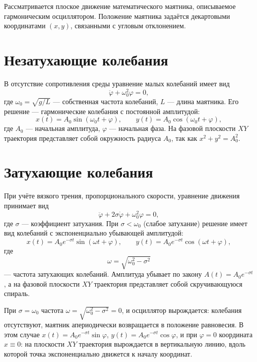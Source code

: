 \documentclass[a4paper]{article}
\newcommand{\subsectiontext}[1]{%
    \phantomsection
    \section*{\fontsize{13pt}{16pt}\selectfont\textbf{#1}}%
}
\begin{document}
Рассматривается плоское движение математического маятника, описываемое гармоническим осциллятором. Положение маятника задаётся декартовыми координатами $(x, y)$, связанными с угловым отклонением.

\subsectiontext{Незатухающие колебания}

В отсутствие сопротивления среды уравнение малых колебаний имеет вид
\begin{equation}
    \ddot{\varphi} + \omega_0^2 \varphi = 0,
\end{equation}
где $\omega_0 = \sqrt{g/L}$ --- собственная частота колебаний, $L$ --- длина маятника. Его решение --- гармонические колебания с постоянной амплитудой:
\begin{equation}
    x(t) = A_0 \sin(\omega_0 t + \varphi), \qquad
    y(t) = A_0 \cos(\omega_0 t + \varphi),
\end{equation}
где $A_0$ --- начальная амплитуда, $\varphi$ --- начальная фаза. На фазовой плоскости $XY$ траектория представляет собой окружность радиуса $A_0$, так как $x^2 + y^2 = A_0^2$.

\subsectiontext{Затухающие колебания}

При учёте вязкого трения, пропорционального скорости, уравнение движения принимает вид
\begin{equation}
    \ddot{\varphi} + 2\sigma \dot{\varphi} + \omega_0^2 \varphi = 0,
\end{equation}
где $\sigma$ --- коэффициент затухания. При $\sigma < \omega_0$ (слабое затухание) решение имеет вид колебаний с экспоненциально убывающей амплитудой:
\begin{equation}
    x(t) = A_0 e^{-\sigma t} \sin(\omega t + \varphi), \qquad
    y(t) = A_0 e^{-\sigma t} \cos(\omega t + \varphi),
\end{equation}
где
\begin{equation}
    \omega = \sqrt{\omega_0^2 - \sigma^2}
\end{equation}
--- частота затухающих колебаний. Амплитуда убывает по закону $A(t) = A_0 e^{-\sigma t}$, а на фазовой плоскости $XY$ траектория представляет собой скручивающуюся спираль.

При $\sigma = \omega_0$ частота $\omega = \sqrt{\omega_0^2 - \sigma^2} = 0$, и осциллятор вырождается: колебания отсутствуют, маятник апериодически возвращается в положение равновесия. В этом случае $x(t) = A_0 e^{-\sigma t}\sin\varphi$, $y(t) = A_0 e^{-\sigma t}\cos\varphi$, и при $\varphi = 0$ координата $x \equiv 0$: на плоскости $XY$ траектория вырождается в вертикальную линию, вдоль которой точка экспоненциально движется к началу координат.
\end{document}
